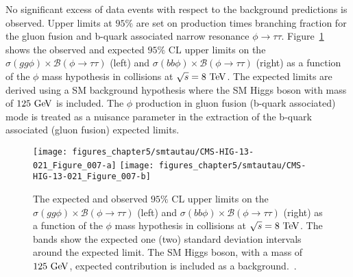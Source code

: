 No significant excess of data events with respect to the background predictions is observed. Upper limits at $95\%$ are set on production times branching fraction for the gluon fusion and b-quark associated narrow resonance $\phi \rightarrow \tau\tau$. Figure~\ref{fig:mssmtautau} shows  the observed and expected $95\%$ CL upper limits on the $\sigma(gg\phi) \times \mathcal{B}(\phi \rightarrow\tau\tau)$ (left) and $\sigma(bb\phi) \times \mathcal{B}(\phi \rightarrow \tau\tau)$ (right) as a function of the $\phi$ mass hypothesis in collisions at $\sqrt{s}=8~\mathrm{Te\kern -0.1em V}$. The expected limits are derived using a SM background hypothesis where the SM Higgs boson with mass of $125~\mathrm{Ge\kern -0.1em V}$ is included. The $\phi$ production in gluon fusion (b-quark associated) mode is treated as a nuisance parameter in the extraction of the b-quark associated (gluon fusion) expected limits.  
\begin{figure}[htbp]
\centering
\texttt{[image: figures\_chapter5/smtautau/CMS-HIG-13-021\_Figure\_007-a]}
\texttt{[image: figures\_chapter5/smtautau/CMS-HIG-13-021\_Figure\_007-b]}
\caption{The expected and observed $95\%$ CL upper limits on the $\sigma(gg\phi) \times \mathcal{B}(\phi \rightarrow\tau\tau)$ (left) and $\sigma(bb\phi) \times \mathcal{B}(\phi \rightarrow \tau\tau)$ (right) as a function of the $\phi$ mass hypothesis in collisions at $\sqrt{s}=8~\mathrm{Te\kern -0.1em V}$. The bands show the expected one (two) standard deviation intervals around the expected limit. The SM Higgs boson, with a mass of $125~\mathrm{Ge\kern -0.1em V}$, expected contribution is included as a background.~\cite{Khachatryan:2014wca}.}
\label{fig:mssmtautau}
\end{figure}

